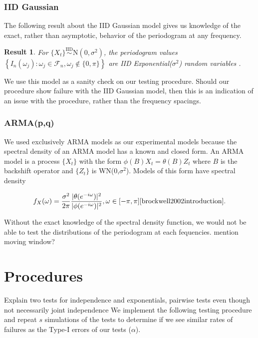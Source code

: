 \documentclass{article}\usepackage[]{graphicx}\usepackage[]{color}
\newcommand{\mj}[1]{{\color{blue} #1}}
\theoremstyle{plain}
\newtheorem{res}{Result}
\begin{document}
\subsubsection*{IID Gaussian}
The following result about the IID Gaussian model gives us knowledge of the exact, rather than asymptotic, behavior of the periodogram at any frequency.

\begin{res}
For $\{X_t\} \stackrel{\text{IID}}{\sim} \text{N}(0,\sigma^2)$, the periodogram values $\left\{ I_n(\omega_j): \omega_j \in \mathcal{F}_n, \omega_j \not\in \{0,\pi\} \right\}$ are IID Exponential($\sigma^2$) random variables \cite{brockwell2002introduction}.
\end{res}

We use this model as a sanity check on our testing procedure. Should our procedure show failure with the IID Gaussian model, then this is an indication of an issue with the procedure, rather than the frequency spacings.

\subsubsection*{ARMA(p,q)}
We used exclusively ARMA models as our experimental models because the spectral density of an ARMA model has a known and closed form. An ARMA model is a process $\{X_t\}$ with the form $\phi(B)X_t = \theta(B)Z_t$ where $B$ is the backshift operator and $\{Z_t\}$ is WN(0,$\sigma^2$). Models of this form have spectral density

\begin{align*}
f_X(\omega) = \frac{\sigma^2}{2\pi} \frac{|\theta(e^{-i \omega})|^2}{|\phi(e^{-i \omega})|^2}, \omega \in [-\pi, \pi] \text{\cite{brockwell2002introduction}}.
\end{align*}

Without the exact knowledge of the spectral density function, we would not be able to test the distributions of the periodogram at each fequencies. \mj{mention moving window?}


\section{Procedures}

\mj{Explain two tests for independence and exponentials, pairwise tests even though not necessarily joint independence}
We implement the following testing procedure and repeat $s$ simulations of the tests to determine if we see similar rates of failures as the Type-I errors of our tests ($\alpha$).
\end{document}
